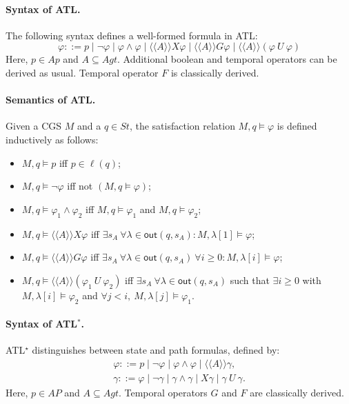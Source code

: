 \paragraph{Syntax of ATL.}
The following syntax defines a well-formed formula in ATL:
\[
\varphi ::= p \mid \neg \varphi \mid \varphi \wedge \varphi
\mid \langle\!\langle A\rangle\!\rangle X \varphi
\mid \langle\!\langle A\rangle\!\rangle G \varphi
\mid \langle\!\langle A\rangle\!\rangle (\varphi \ U \ \varphi)
\]
Here, $p \in Ap$ and $A \subseteq Agt$. Additional boolean and temporal operators can be derived as usual. Temporal operator $F$ is classically derived.

\paragraph{Semantics of ATL.}
Given a CGS $M$ and a $q \in St$, the satisfaction relation $M,q \models \varphi$ is defined inductively as follows:
\begin{itemize}
  \item[-] $M,q \models p$ iff $p \in \ell(q)$;
  \item[-] $M,q \models \neg \varphi$ iff not $(M,q \models \varphi)$;
  \item[-] $M,q \models \varphi_1 \wedge \varphi_2$ iff
        $M,q \models \varphi_1$ and $M,q \models \varphi_2$;
  \item[-] $M,q \models \langle\!\langle A\rangle\!\rangle X \varphi$ iff
        $\exists s_A \ \forall \lambda \in \mathsf{out}(q,s_A):
        M,\lambda[1] \models \varphi$;
  \item[-] $M,q \models \langle\!\langle A\rangle\!\rangle G \varphi$ iff
        $\exists s_A \ \forall \lambda \in \mathsf{out}(q,s_A) \ \forall i \ge 0:
        M,\lambda[i] \models \varphi$;
  \item[-] $M,q \models \langle\!\langle A\rangle\!\rangle (\varphi_1 \ U \ \varphi_2)$ iff
        $\exists s_A \ \forall \lambda \in \mathsf{out}(q,s_A)$ such that
        $\exists i \ge 0$ with $M,\lambda[i] \models \varphi_2$ and
        $\forall j < i,\ M,\lambda[j] \models \varphi_1$.
\end{itemize}

\paragraph{Syntax of ATL$^*$.}
ATL$^\star$  distinguishes between state and path formulas, defined by:
\[
\begin{array}{l}
\varphi ::= p \mid \neg \varphi \mid \varphi \wedge \varphi
\mid \langle\!\langle A\rangle\!\rangle \gamma, \\
\gamma ::= \varphi \mid \neg \gamma \mid \gamma \wedge \gamma
\mid X\gamma \mid \gamma \ U \ \gamma .
\end{array}
\]
Here, $p \in AP$ and $A \subseteq Agt$. Temporal operators $G$ and $F$ are classically derived.

